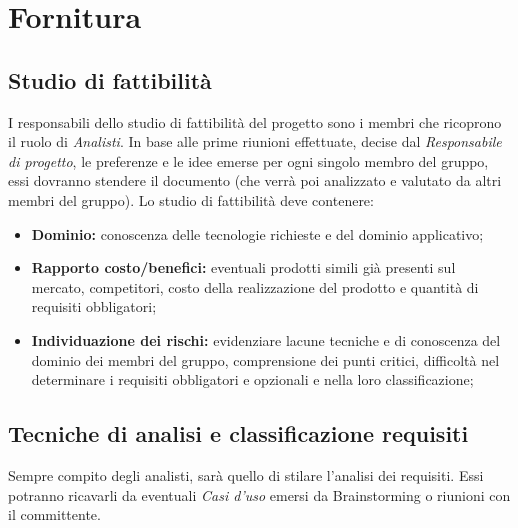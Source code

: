 \documentclass[a4paper]{report}
\begin{document}
		\section{Fornitura}
			\subsection{Studio di fattibilità}
				I responsabili dello studio di fattibilità del progetto sono i membri che ricoprono il ruolo di \emph{Analisti}. In base alle prime
				riunioni effettuate, decise dal \emph{Responsabile di progetto}, le preferenze e le idee emerse per ogni singolo 
				membro del gruppo, essi dovranno stendere il documento (che verrà poi analizzato e valutato da altri membri del gruppo). Lo studio 
				di fattibilità deve contenere:
				\begin{itemize}
					\item \textbf{Dominio:} conoscenza delle tecnologie richieste e del dominio applicativo;
					\item \textbf{Rapporto costo/benefici:} eventuali prodotti simili già presenti sul mercato, competitori, costo della 
					realizzazione del prodotto e quantità di requisiti obbligatori;
					\item \textbf{Individuazione dei rischi:} evidenziare lacune tecniche e di conoscenza del dominio dei membri del gruppo, comprensione
					dei punti critici, difficoltà nel determinare i requisiti obbligatori e opzionali e nella loro classificazione; 
				\end{itemize}				 
			\subsection{Tecniche di analisi e classificazione requisiti}
				Sempre compito degli analisti, sarà quello di stilare l'analisi dei requisiti. Essi potranno ricavarli da eventuali \emph{Casi 
				d'uso} emersi da Brainstorming o riunioni con il committente.
				
\end{document}

